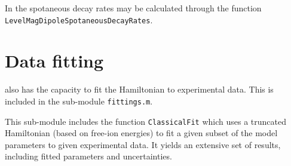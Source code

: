 \documentclass{article}
\newcommand{\codetext}[1]{{\color{BlueViolet} \texttt{#1}}}
\begin{document}
In \qlanth the spotaneous decay rates may be calculated through the function \codetext{LevelMagDipoleSpotaneousDecayRates}.

 

\section{Data fitting}

\qlanth also has the capacity to fit the Hamiltonian to experimental data. This is included in the sub-module \codetext{fittings.m}.

This sub-module includes the function \codetext{ClassicalFit} which uses a truncated Hamiltonian (based on free-ion energies) to fit a given subset of the model parameters to given experimental data. It yields an extensive set of results, including fitted parameters and uncertainties.
\end{document}
